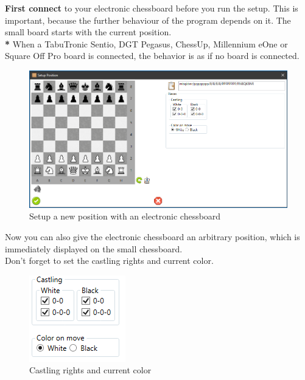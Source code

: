 \documentclass[11pt,a4paper]{article}
\begin{document}
\textbf{First connect} to your electronic chessboard before you run the setup. This is important, because the further behaviour of the program depends on it.
The small board starts with the current position.\\
\textbf{{\color{red}*}} When a TabuTronic Sentio, DGT Pegasus, ChessUp, Millennium eOne or Square Off Pro board is connected, the behavior is as if no board is connected.

\begin{figure}[H]
	\centering
	\includegraphics[scale=0.5]{SetupPosition4.png}
	\caption{Setup a new position with an electronic chessboard}
	\label{fig:SetupPosition4}
\end{figure}

Now you can also give the electronic chessboard an arbitrary position, which is immediately displayed on the small chessboard.\\
Don't forget to set the castling rights and current color.

\begin{figure}[H]
	\centering
	\includegraphics[scale=1.0]{castling.png}
	\caption{Castling rights and current color}
	\label{fig:castling2}
\end{figure}
\end{document}
